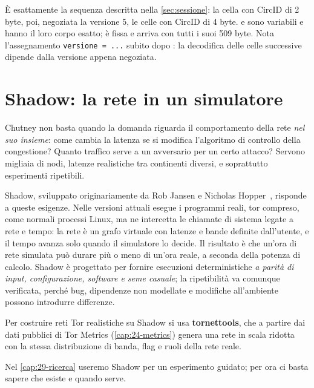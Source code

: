 È esattamente la sequenza descritta nella \cref{sec:sessione}: la cella  con CircID di 2 byte, poi, negoziata la versione 5, le celle con CircID di 4 byte.  e  sono variabili e hanno il loro corpo esatto;  è fissa e arriva con tutti i suoi 509 byte. Nota l'assegnamento \texttt{versione = ...} subito dopo : la decodifica delle celle successive dipende dalla versione appena negoziata.

\section{Shadow: la rete in un simulatore}\label{sec:rp-shadow}

Chutney non basta quando la domanda riguarda il comportamento della rete \emph{nel suo insieme}: come cambia la latenza se si modifica l'algoritmo di controllo della congestione? Quanto traffico serve a un avversario per un certo attacco? Servono migliaia di nodi, latenze realistiche tra continenti diversi, e soprattutto esperimenti ripetibili.

Shadow, sviluppato originariamente da Rob Jansen e Nicholas Hopper~\cite{jansen2012shadow}, risponde a queste esigenze. Nelle versioni attuali esegue i programmi reali, tor compreso, come normali processi Linux, ma ne intercetta le chiamate di sistema legate a rete e tempo: la rete è un grafo virtuale con latenze e bande definite dall'utente, e il tempo avanza solo quando il simulatore lo decide. Il risultato è che un'ora di rete simulata può durare più o meno di un'ora reale, a seconda della potenza di calcolo. Shadow è progettato per fornire esecuzioni deterministiche \emph{a parità di input, configurazione, software e seme casuale}; la ripetibilità va comunque verificata, perché bug, dipendenze non modellate e modifiche all'ambiente possono introdurre differenze.

Per costruire reti Tor realistiche su Shadow si usa \textbf{tornettools}, che a partire dai dati pubblici di Tor Metrics (\cref{cap:24-metrics}) genera una rete in scala ridotta con la stessa distribuzione di banda, flag e ruoli della rete reale.

Nel \cref{cap:29-ricerca} useremo Shadow per un esperimento guidato; per ora ci basta sapere che esiste e quando serve.

